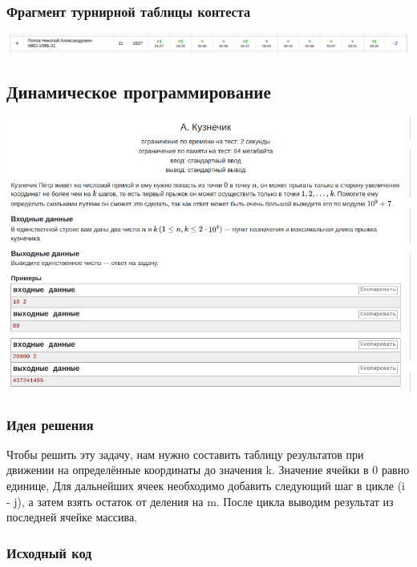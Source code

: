 \subsubsection*{Фрагмент турнирной таблицы контеста}
\begin{center}
\includegraphics[width=\textwidth]{standings/Contest1Result.png}\newline\noindent
\end{center}


\subsection*{Динамическое программирование}

\begin{center}
\includegraphics[width=\textwidth]{statements/Contest3A.png}
\end{center}

\subsubsection*{Идея решения}

Чтобы решить эту задачу, нам нужно составить таблицу результатов при движении на определённые координаты до значения k. Значение ячейки в 0 равно единице,
Для дальнейших ячеек необходимо добавить следующий шаг в цикле (i - j), а затем взять остаток от деления на m. После цикла выводим результат из последней ячейке массива.

\subsubsection*{Исходный код}


